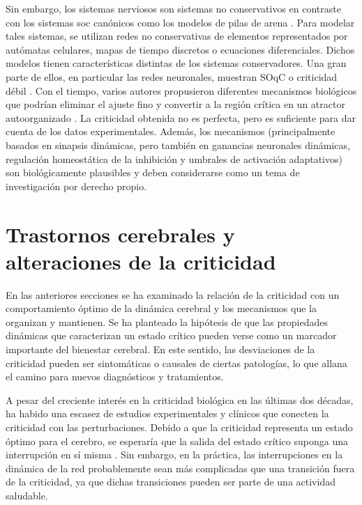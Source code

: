 Sin embargo, los sistemas nerviosos son sistemas no conservativos en contraste con los sistemas \gls{soc}  canónicos como los modelos de pilas de arena \cite{jensen_self-organized_1998,pruessner_self-organised_2012}. Para modelar tales sistemas, se utilizan redes no conservativas de elementos representados por autómatas celulares, mapas de tiempo discretos o ecuaciones diferenciales. Dichos modelos tienen características distintas de los sistemas conservadores. Una gran parte de ellos, en particular las redes neuronales, muestran \gls{SOqC} \cite{bonachela_self-organization_2009,bonachela_self-organization_2010,buendia_feedback_2020} o criticidad débil \cite{palmieri_emergence_2018,palmieri_forest_2020}. Con el tiempo, varios autores propusieron diferentes mecanismos biológicos que podrían eliminar el ajuste fino y convertir a la región crítica en un atractor autoorganizado \cite{kinouchi_mechanisms_2020,zeraati_self-organization_2021,meisel_adaptive_2009,droste_analytical_2013,tetzlaff_self-organized_2010,meisel_failure_2012,rocha_homeostatic_2018,plenz_self-organized_2021,levina_phase_2009,ma_cortical_2019}. La criticidad obtenida no es perfecta, pero es suficiente para dar cuenta de los datos experimentales. Además, los mecanismos (principalmente basados en sinapsis dinámicas, pero también en ganancias neuronales dinámicas, regulación homeostática de la inhibición y umbrales de activación adaptativos) son biológicamente plausibles y deben considerarse como un tema de investigación por derecho propio.


\section{Trastornos cerebrales y alteraciones de la criticidad}


En las anteriores secciones se ha examinado la relación de la criticidad con un comportamiento óptimo de la dinámica cerebral y los mecanismos que la organizan y mantienen. Se ha planteado la hipótesis de que las propiedades dinámicas que caracterizan un estado crítico pueden verse como un marcador importante del bienestar cerebral. En este sentido, las desviaciones de la criticidad pueden ser sintomáticas o causales de ciertas patologías, lo que allana el camino para nuevos diagnósticos y tratamientos.

A pesar del creciente interés en la criticidad biológica en las últimas dos décadas, ha habido una escasez de estudios experimentales y clínicos que conecten la criticidad con las perturbaciones. Debido a que la criticidad representa un estado óptimo para el cerebro, se esperaría que la salida del estado crítico suponga una interrupción en sí misma \cite{heiney_criticality_2021}. Sin embargo, en la práctica, las interrupciones en la dinámica de la red probablemente sean más complicadas que una transición fuera de la criticidad, ya que dichas transiciones pueden ser parte de una actividad saludable.

